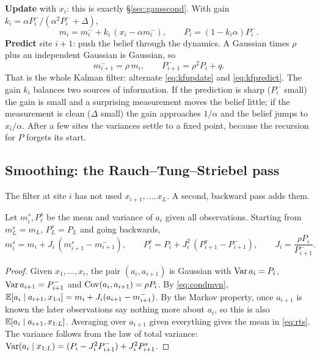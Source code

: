 \textbf{Update} with $x_i$: this is exactly \S\ref{sec:gausscond}. With gain $k_i=\alpha P_i^-/(\alpha^2P_i^-+\Delta)$,
\begin{equation}\label{eq:kfupdate}
  m_i=m_i^-+k_i\,(x_i-\alpha m_i^-),\qquad P_i=(1-k_i\alpha)P_i^- .
\end{equation}
\textbf{Predict} site $i+1$: push the belief through the dynamics. A Gaussian times $\rho$ plus an independent
Gaussian is Gaussian, so
\begin{equation}\label{eq:kfpredict}
  m_{i+1}^-=\rho\,m_i,\qquad P_{i+1}^-=\rho^2P_i+q .
\end{equation}
That is the whole Kalman filter: alternate \eqref{eq:kfupdate} and \eqref{eq:kfpredict}. The gain $k_i$ balances
two sources of information. If the prediction is sharp ($P_i^-$ small) the gain is small and a surprising
measurement moves the belief little; if the measurement is clean ($\Delta$ small) the gain approaches $1/\alpha$
and the belief jumps to $x_i/\alpha$. After a few sites the variances settle to a fixed point, because the
recursion for $P$ forgets its start.

\subsection{Smoothing: the Rauch--Tung--Striebel pass}

The filter at site $i$ has not used $x_{i+1},\dots,x_L$. A second, backward pass adds them.

\begin{proposition}
Let $m_i^s,P_i^s$ be the mean and variance of $a_i$ given all observations. Starting from $m_L^s=m_L$,
$P_L^s=P_L$ and going backwards,
\begin{equation}\label{eq:rts}
  m_i^s=m_i+J_i\,(m_{i+1}^s-m_{i+1}^-),\qquad P_i^s=P_i+J_i^2\,(P_{i+1}^s-P_{i+1}^-),\qquad J_i=\frac{\rho P_i}{P_{i+1}^-}.
\end{equation}
\end{proposition}
\begin{proof}
Given $x_1,\dots,x_i$, the pair $(a_i,a_{i+1})$ is Gaussian with $\operatorname{Var} a_i=P_i$, $\operatorname{Var} a_{i+1}=P_{i+1}^-$ and
$\operatorname{Cov}(a_i,a_{i+1})=\rho P_i$. By \eqref{eq:condmvn},
$\mathbb{E}[a_i\mid a_{i+1},x_{1:i}]=m_i+J_i(a_{i+1}-m_{i+1}^-)$. By the Markov property, once $a_{i+1}$ is known the later
observations say nothing more about $a_i$, so this is also $\mathbb{E}[a_i\mid a_{i+1},x_{1:L}]$. Averaging over $a_{i+1}$
given everything gives the mean in \eqref{eq:rts}. The variance follows from the law of total variance:
$\operatorname{Var}(a_i\mid x_{1:L})=(P_i-J_i^2P^-_{i+1})+J_i^2P^s_{i+1}$.
\end{proof}

